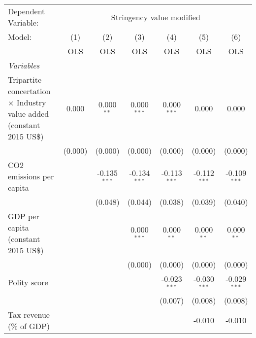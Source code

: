 
\begingroup
\centering
\begin{tabular}{lcccccc}
   \toprule
   Dependent Variable: & \multicolumn{6}{c}{Stringency value modified}\\
   Model:                                                                       & (1)     & (2)            & (3)            & (4)            & (5)            & (6)\\  
                                                                                &  OLS    & OLS            & OLS            & OLS            & OLS            & OLS\\  
   \midrule
   \emph{Variables}\\
   Tripartite concertation $\times$ Industry value added (constant 2015 US\$)   & 0.000   & 0.000$^{**}$   & 0.000$^{***}$  & 0.000$^{***}$  & 0.000          & 0.000\\   
                                                                                & (0.000) & (0.000)        & (0.000)        & (0.000)        & (0.000)        & (0.000)\\   
   CO2 emissions per capita                                                     &         & -0.135$^{***}$ & -0.134$^{***}$ & -0.113$^{***}$ & -0.112$^{***}$ & -0.109$^{***}$\\   
                                                                                &         & (0.048)        & (0.044)        & (0.038)        & (0.039)        & (0.040)\\   
   GDP per capita (constant 2015 US\$)                                          &         &                & 0.000$^{***}$  & 0.000$^{**}$   & 0.000$^{**}$   & 0.000$^{**}$\\   
                                                                                &         &                & (0.000)        & (0.000)        & (0.000)        & (0.000)\\   
   Polity score                                                                 &         &                &                & -0.023$^{***}$ & -0.030$^{***}$ & -0.029$^{***}$\\   
                                                                                &         &                &                & (0.007)        & (0.008)        & (0.008)\\   
   Tax revenue (\% of GDP)                                                      &         &                &                &                & -0.010         & -0.010\\   

\end{tabular}
